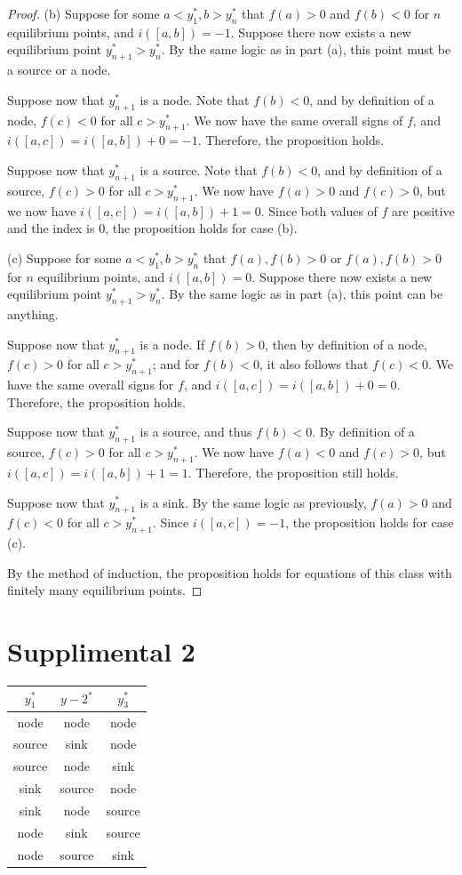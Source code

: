 \documentclass[11pt, letterpaper]{report}
\begin{document}
\begin{proof}
	(b) Suppose for some $a<y_1^*,b>y_n^*$ that $f(a)>0$ and $f(b)<0$ for $n$ equilibrium points, and $i([a,b])=-1$. Suppose there now exists a new equilibrium point $y_{n+1}^*>y_n^*$. By the same logic as in part (a), this point must be a source or a node.

	Suppose now that $y_{n+1}^*$ is a node. Note that $f(b)<0$, and by definition of a node, $f(c)<0$ for all $c>y_{n+1}^*$. We now have the same overall signs of  $f$, and $i([a,c])=i([a,b])+0=-1$. Therefore, the proposition holds.

	Suppose now that $y_{n+1}^*$ is a source. Note that $f(b)<0$, and by definition of a source, $f(c)>0$ for all $c>y_{n+1}^*$. We  now have $f(a)>0$ and $f(c)>0$, but we now have $i([a,c])=i([a,b])+1=0$. Since both values of $f$ are positive and the index is 0, the proposition holds for case (b).

	(c) Suppose for some $a<y_1^*,b>y_n^*$ that $f(a),f(b)>0$ or $f(a),f(b)>0$ for $n$ equilibrium points, and $i([a,b])=0$. Suppose there now exists a new equilibrium point $y_{n+1}^*>y_n^*$. By the same logic as in part (a), this point can be anything.

	Suppose now that $y_{n+1}^*$ is a node. If $f(b)>0$, then by definition of a node, $f(c)>0$ for all  $c>y_{n+1}^*$; and for $f(b)<0$, it also follows that $f(c)<0$. We have the same overall signs for $f$, and $i([a,c])=i([a,b])+0=0$. Therefore, the proposition holds.

	Suppose now that $y_{n+1}^*$ is a source, and thus $f(b)<0$. By definition of a source, $f(c)>0$ for all $c>y_{n+1}^*$. We now have $f(a)<0$ and $f(c)> 0$, but $i([a,c])=i([a,b])+1=1$. Therefore, the proposition still holds.

	Suppose now that $y_{n+1}^*$ is a sink. By the same logic as previously, $f(a)>0$ and $f(c)<0$ for all $c>y_{n+1}^*$. Since $i([a,c])=-1$, the proposition holds for case (c).

	By the method of induction, the proposition holds for equations of this class with finitely many equilibrium points.
\end{proof}
\section*{Supplimental 2}
\begin{center}
\begin{tabular}{ccc}
	\toprule
	$y_1^*$ &$y-2^*$ &$y_3^*$ \\
	\midrule
	node&node&node\\
	source&sink&node\\
	source&node&sink\\
	sink&source&node\\
	sink&node&source\\
	node&sink&source\\
	node&source&sink\\
	\bottomrule
\end{tabular}
\end{center}
\end{document}
